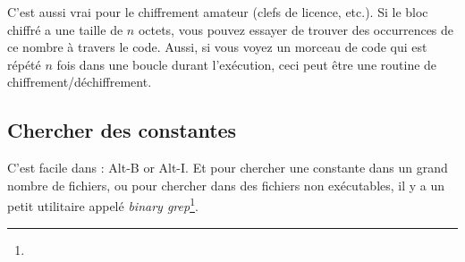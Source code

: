 C'est aussi vrai pour le chiffrement amateur (clefs de licence, etc.).
Si le bloc chiffré a une taille de $n$ octets, vous pouvez essayer de trouver des
occurrences de ce nombre à travers le code.
Aussi, si vous voyez un morceau de code qui est répété $n$ fois dans une boucle durant
l'exécution, ceci peut être une routine de chiffrement/déchiffrement.

\subsection{Chercher des constantes}

C'est facile dans \IDA: Alt-B or Alt-I.
Et pour chercher une constante dans un grand nombre de fichiers, ou pour chercher
dans des fichiers non exécutables, il y a un petit utilitaire appelé \emph{binary grep}\footnote{\BGREPURL}.

